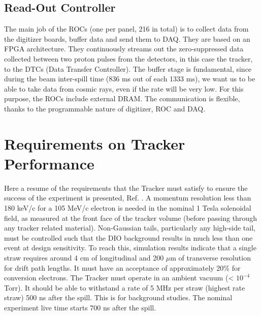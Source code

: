 \subsection{Read-Out Controller}\label{ROC} 
The main job of the ROCs (one per panel, 216 in total) 
is to collect data from the digitizer boards, buffer data and 
send them to DAQ. They are based on an FPGA architecture. They 
continuously streams out the zero-suppressed data collected between 
two proton pulses from the detectors, in this case the tracker, to 
the DTCs (Data Transfer Controller)\cite{GIOIOSA2023167732}. The buffer 
stage is fundamental, since during the beam inter-spill time (836 ms 
out of each 1333 ms), we want us to be able to take data from cosmic 
rays, even if the rate will be very low. For this purpose, the ROCs 
include external DRAM. The communication is flexible, thanks to the 
programmable nature of digitizer, ROC and DAQ. 
\section{Requirements on Tracker Performance}
Here a resume of the requirements that the Tracker must satisfy to ensure the success of the experiment is presented, Ref. \cite{trkreq}.
A momentum resolution less than 180 keV/c for a 105 MeV/c electron is needed in the nominal
1 Tesla solenoidal field, as measured at the front face of the tracker volume (before
passing through any tracker related material). Non-Gaussian tails, particularly any
high-side tail, must be controlled such that the DIO background results in much less
than one event at design sensitivity. To reach this, simulation results indicate that 
a single straw requires around 4 cm of longitudinal and 200 $\mu$m of transverse resolution for drift path lengths. 
It must have an acceptance of approximately 20\% for conversion electrons.
The Tracker must operate in an ambient vacuum (< $10^{-4}$ Torr).
It should be able to withstand a rate of 5 MHz per straw (highest rate straw) 500 ns after the spill. This is
for background studies. The nominal experiment live time starts 700 ns after the spill.
